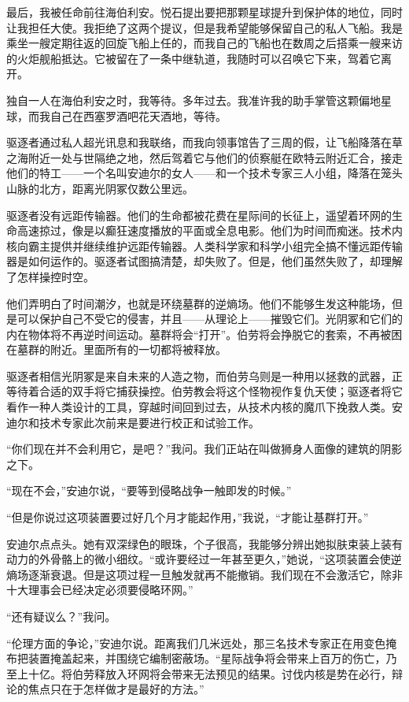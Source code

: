 \documentclass[AutoFakeBold=true]{book}
\begin{document}
{最后，我被任命前往海伯利安。悦石提出要把那颗星球提升到保护体的地位，同时让我担任大使。我拒绝了这两个提议，但是我希望能够保留自己的私人飞船。我是乘坐一艘定期往返的回旋飞船上任的，而我自己的飞船也在数周之后搭乘一艘来访的火炬舰船抵达。它被留在了一条中继轨道，我随时可以召唤它下来，驾着它离开。

独自一人在海伯利安之时，我等待。多年过去。我准许我的助手掌管这颗偏地星球，而我自己在西塞罗酒吧花天酒地，等待。

驱逐者通过私人超光讯息和我联络，而我向领事馆告了三周的假，让飞船降落在草之海附近一处与世隔绝之地，然后驾着它与他们的侦察艇在欧特云附近汇合，接走他们的特工——一个名叫安迪尔的女人——和一个技术专家三人小组，降落在笼头山脉的北方，距离光阴冢仅数公里远。

驱逐者没有远距传输器。他们的生命都被花费在星际间的长征上，遥望着环网的生命高速掠过，像是以癫狂速度播放的平面或全息电影。他们为时间而痴迷。技术内核向霸主提供并继续维护远距传输器。人类科学家和科学小组完全搞不懂远距传输器是如何运作的。驱逐者试图搞清楚，却失败了。但是，他们虽然失败了，却理解了怎样操控时空。

他们弄明白了时间潮汐，也就是环绕墓群的逆熵场。他们不能够生发这种能场，但是可以保护自己不受它的侵害，并且——从理论上——摧毁它们。光阴冢和它们的内在物体将不再逆时间运动。墓群将会``打开''。伯劳将会挣脱它的套索，不再被困在墓群的附近。里面所有的一切都将被释放。

驱逐者相信光阴冢是来自未来的人造之物，而伯劳乌则是一种用以拯救的武器，正等待着合适的双手将它捕获操控。伯劳教会将这个怪物视作复仇天使；驱逐者将它看作一种人类设计的工具，穿越时间回到过去，从技术内核的魔爪下挽救人类。安迪尔和技术专家此次前来是要进行校正和试验工作。

``你们现在并不会利用它，是吧？''我问。我们正站在叫做狮身人面像的建筑的阴影之下。

``现在不会，''安迪尔说，``要等到侵略战争一触即发的时候。''

``但是你说过这项装置要过好几个月才能起作用，''我说，``才能让基群打开。''

安迪尔点点头。她有双深绿色的眼珠，个子很高，我能够分辨出她拟肤束装上装有动力的外骨骼上的微小细纹。``或许要经过一年甚至更久，''她说，``这项装置会使逆熵场逐渐衰退。但是这项过程一旦触发就再不能撤销。我们现在不会激活它，除非十大理事会已经决定必须要侵略环网。''

``还有疑议么？''我问。

``伦理方面的争论，''安迪尔说。距离我们几米远处，那三名技术专家正在用变色掩布把装置掩盖起来，并围绕它编制密蔽场。``星际战争将会带来上百万的伤亡，乃至上十亿。将伯劳释放入环网将会带来无法预见的结果。讨伐内核是势在必行，辩论的焦点只在于怎样做才是最好的方法。''

}
\end{document}
